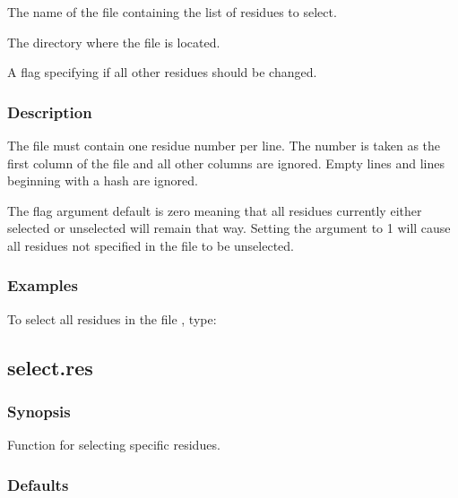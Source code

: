    The name of the file containing the list of residues to select.   

   The directory where the file is located.   

   A flag specifying if all other residues should be changed.  

  

  
 \subsubsection{Description} 

 The file must contain one residue number per line.  The number is taken as the first column of the file and all other columns are ignored.  Empty lines and lines beginning with a hash are ignored. 
  

 The  flag argument default is zero meaning that all residues currently either selected or unselected will remain that way.  Setting the argument to 1 will cause all residues not specified in the file to be unselected. 
  

  
 \subsubsection{Examples} 

 To select all residues in the file , type: 
  



  

 \newpage 

 \subsection{select.res} 

  
 \subsubsection{Synopsis} 

 Function for selecting specific residues. 
  

  
 \subsubsection{Defaults} 

